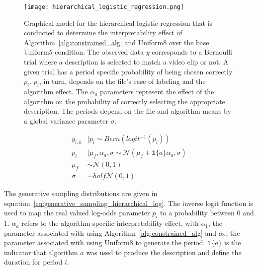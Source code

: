 \begin{figure}
\centering
\texttt{[image: hierarchical\_logistic\_regression.png]}
\caption{Graphical model for the hierarchical logistic regression that is conducted to determine the interpretability effect of Algorithm~\ref{alg:constrained_alg} and Uniform8 over the base Uniform5 condition. The observed data $y$ corresponds to a Bernoulli trial where a description is selected to match a video clip or not. A given trial has a period specific probability of being chosen correctly $p_i$. $p_i$, in turn, depends on the file's ease of labeling and the algorithm effect. The $\alpha_a$ parameters represent the effect of the algorithm on the probability of correctly selecting the appropriate description. The periods depend on the file and algorithm means by a global variance parameter $\sigma$.}
\label{fig:hierarchical_logistic_regression}
\end{figure}

\begin{equation}\label{eq:generative_sampling_hierarchical_log}
  \begin{split}
    y_{i,k} &\mid p_i \sim Bern(logit^{-1}(p_i)) \\
    p_i &\mid \mu_f,\alpha_a,\sigma \sim \mathcal{N}(\mu_f + \mathbb{1}\{a\} \alpha_a, \sigma ) \\
    \mu_f &\sim \mathcal{N}(0,1) \\
    \sigma &\sim half\mathcal{N}(0,1)
  \end{split}
\end{equation}

The generative sampling distributions are given in equation~\ref{eq:generative_sampling_hierarchical_log}. The inverse logit function is used to map the real valued log-odds parameter $p_i$ to a probability between $0$ and $1$. $\alpha_a$ refers to the algorithm specific interpretability effect, with $\alpha_1$, the parameter associated with using Algorithm~\ref{alg:constrained_alg} and $\alpha_2$, the parameter associated with using Uniform8 to generate the period. $\mathbb{1}\{a\}$ is the indicator that algorithm $a$ was used to produce the description and define the duration for period $i$.

